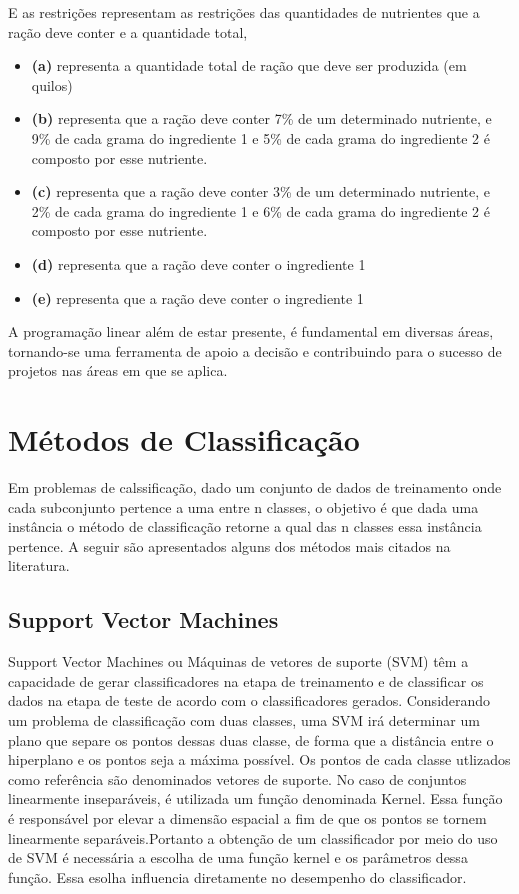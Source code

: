 E as restrições representam as restrições das quantidades de nutrientes que a ração deve conter e a quantidade total,
\begin{itemize}
\item \textbf {(a)} representa a quantidade total de ração que deve ser produzida (em quilos)
\item \textbf {(b)} representa que a ração deve conter 7\% de um determinado nutriente, e 9\% de cada grama do ingrediente 1 e 5\% de cada grama do ingrediente 2 é composto por esse nutriente. 
\item \textbf {(c)} representa que a ração deve conter 3\% de um determinado nutriente, e 2\% de cada grama do ingrediente 1 e 6\% de cada grama do ingrediente 2 é composto por esse nutriente.
\item \textbf {(d)} representa que a ração deve conter o ingrediente 1
\item \textbf {(e)} representa que a ração deve conter o ingrediente 1
\end{itemize}

A programação linear além de estar presente, é fundamental em diversas áreas, tornando-se uma ferramenta de apoio a decisão e contribuindo para o sucesso de projetos nas áreas em que se aplica.

\section{Métodos de Classificação}
Em problemas de calssificação, dado um conjunto de dados de treinamento onde cada subconjunto pertence a uma entre n classes, o objetivo é que dada uma instância o método de classificação retorne a qual das n classes essa instância pertence. A seguir são apresentados alguns dos métodos mais citados na literatura. 

\subsection{Support Vector Machines}
Support Vector Machines ou Máquinas de vetores de suporte (SVM) têm a capacidade de gerar classificadores na etapa de treinamento e de classificar os dados na etapa de teste de acordo com o classificadores gerados. Considerando um problema de classificação com duas classes, uma SVM irá determinar um plano que separe os pontos dessas duas classe, de forma que a distância entre o hiperplano e os pontos seja a máxima possível. Os pontos de cada classe utlizados como referência são denominados vetores de suporte.
No caso de conjuntos linearmente inseparáveis, é utilizada um função denominada Kernel. Essa função é responsável por elevar a dimensão espacial a fim de que os pontos se tornem linearmente separáveis.Portanto a obtenção de um classificador por meio do uso de SVM é necessária a escolha de uma função kernel e os parâmetros dessa função. Essa esolha influencia diretamente no desempenho do classificador\cite{Gunn98SVM}\cite{Reffson02SVM}.

